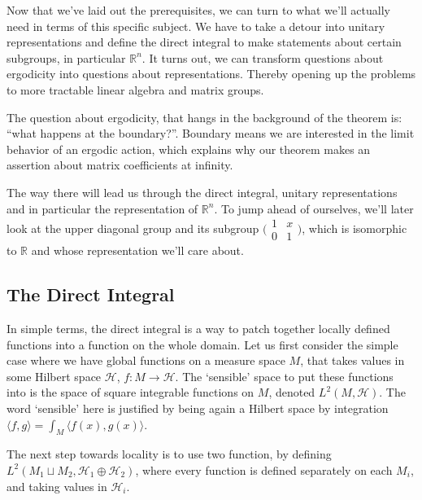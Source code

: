 \documentclass[
  12pt
]{article}
\theoremstyle{plain}
\newcommand{\bbr}{\ensuremath{\mathbb{R}}\xspace}
\newcommand{\ipmatrix}[1]{%
\ensuremath{\big(\begin{smallmatrix} #1 \end{smallmatrix}\big)}\xspace}
\begin{document}
  Now that we've laid out the prerequisites, we can turn to what we'll actually need in terms of this specific subject.
  We have to take a detour into unitary
  representations and define the direct integral to make statements about
  certain subgroups, in particular $\bbr^n$.
  It turns out, we can transform questions about ergodicity into questions about representations.
  Thereby opening up the problems to more tractable linear algebra and matrix groups.

  The question about ergodicity, that hangs in the background of the theorem is:
  ``what happens at the boundary?''. Boundary means we are interested in the limit behavior of an ergodic action, which explains why our theorem makes an assertion about matrix coefficients at infinity.

  The way there will lead us through the direct integral, unitary representations
  and in particular the representation of $\mathbb{R}^n$. To jump ahead of
  ourselves, we'll later look at the upper diagonal group and its subgroup
  \ipmatrix{1 & x \\ 0 & 1}, which is isomorphic to $\mathbb{R}$ and whose
  representation we'll care about.

  \hypertarget{the-direct-integral}{%
  \subsection{The Direct Integral}\label{the-direct-integral}}

  In simple terms, the direct integral is a way to patch together locally
  defined functions into a function on the whole domain. Let us first
  consider the simple case where we have global functions on a measure
  space $M$, that takes values in some Hilbert space $\mathscr{H}$,
  $f:M \rightarrow \mathscr{H}$. The `sensible' space to put these
  functions into is the space of square integrable functions on $M$,
  denoted $L^2(M, \mathscr{H})$. The word `sensible' here is justified
  by being again a Hilbert space by integration
  $\langle f, g\rangle = \int_M\langle f(x), g(x)\rangle$.


  The next step towards locality is to use two function, by defining
  $L^2(M_1 \sqcup M_2, \mathscr{H}_1 \oplus \mathscr{H}_2)$, where every
  function is defined separately on each $M_i$, and taking values in
  $\mathscr{H}_i$.
\end{document}
